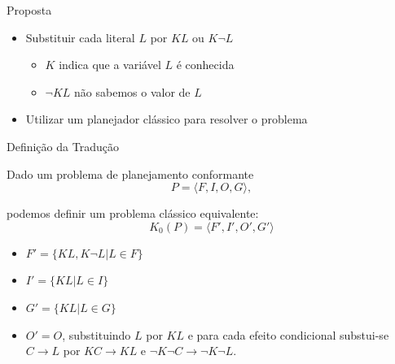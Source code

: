 \begin{frame}{Proposta}
    \begin{itemize}
    \item Substituir cada literal $L$ por $ KL$ ou $K \lnot L$
        \begin{itemize}
            \item $K$ indica que a variável $L$ é conhecida 
            \item $\lnot KL$ não sabemos o valor de $L$
        \end{itemize}  
    \item Utilizar um planejador clássico para resolver o problema
    \end{itemize}  
\end{frame}

\begin{frame}{Definição da Tradução}

    Dado um problema de planejamento conformante\\
    \[P=\langle F, I, O, G\rangle,\]
    
    podemos definir um problema clássico equivalente:\\
    \[K_0(P)=\langle F', I', O', G'\rangle\]
    \begin{itemize}
        \item $F' = \{ KL, K \lnot L | L \in F \}$
        \item $I' = \{ KL | L \in I \}$
        \item $G' = \{ KL | L \in G \}$
        \item $O' = O$, substituindo $L$ por $KL$ e para cada efeito condicional substui-se
        $C \rightarrow L$ por $KC \rightarrow KL$ e $\lnot K \lnot C \rightarrow \lnot K \lnot L$. 
    \end{itemize}  
\end{frame}






